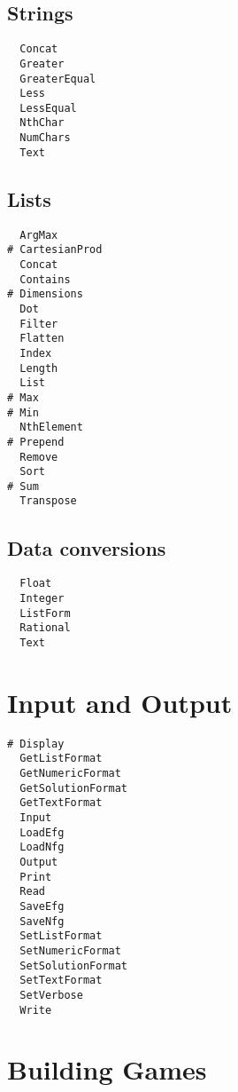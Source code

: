 \subsection{Strings}

\begin{multicols}{3}
\begin{verbatim}
  Concat
  Greater
  GreaterEqual
  Less
  LessEqual
  NthChar 
  NumChars 
  Text
\end{verbatim}
\end{multicols}

\subsection{Lists}

\begin{multicols}{3}
\begin{verbatim}
  ArgMax 
# CartesianProd
  Concat 
  Contains 
# Dimensions
  Dot 
  Filter 
  Flatten 
  Index
  Length 
  List 
# Max
# Min
  NthElement 
# Prepend
  Remove 
  Sort 
# Sum 
  Transpose 
\end{verbatim}
\end{multicols}

\subsection{Data conversions}

\begin{multicols}{3}
\begin{verbatim}
  Float 
  Integer 
  ListForm 
  Rational 
  Text 
\end{verbatim}
\end{multicols}

\section{Input and Output}

\begin{multicols}{3}
\begin{verbatim}
# Display 
  GetListFormat 
  GetNumericFormat 
  GetSolutionFormat 
  GetTextFormat 
  Input 
  LoadEfg 
  LoadNfg 
  Output 
  Print
  Read 
  SaveEfg 
  SaveNfg 
  SetListFormat 
  SetNumericFormat 
  SetSolutionFormat 
  SetTextFormat 
  SetVerbose
  Write   
\end{verbatim}
\end{multicols}

\section{Building Games}

